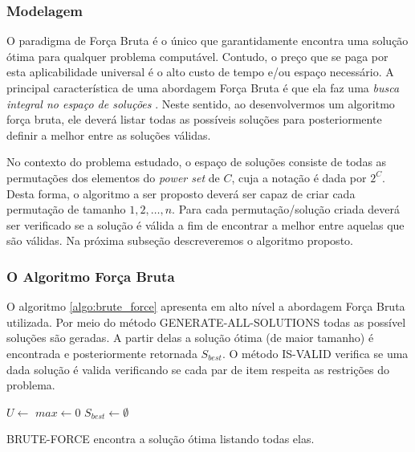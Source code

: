 \documentclass[12pt]{article}
\begin{document}
\subsubsection{Modelagem}
\label{subsubsec:model_fb}
O paradigma de Força Bruta é o único que garantidamente encontra uma solução ótima para qualquer problema computável. Contudo, o preço que se paga por esta aplicabilidade universal é o alto custo de tempo e/ou espaço necessário. A principal característica de uma abordagem Força Bruta é que ela faz uma \textit{busca integral no espaço de soluções} \cite{Kleinberg:2005:AD:1051910}{}. Neste sentido, ao desenvolvermos um algoritmo força bruta, ele deverá listar todas as possíveis soluções para posteriormente definir a melhor entre as soluções válidas.

No contexto do problema estudado, o espaço de soluções consiste de todas as permutações dos elementos do \textit{power set} de $C$, cuja a notação é dada por $2^{C}$. Desta forma, o algoritmo a ser proposto deverá ser capaz de criar cada permutação de tamanho $1,2,\ldots, n$. Para cada permutação/solução criada deverá ser verificado se a solução é válida a fim de encontrar a melhor entre aquelas que são válidas. Na próxima subseção descreveremos o algoritmo proposto.

\subsubsection{O Algoritmo Força Bruta}
\label{subsubsec:alg_fb}

O algoritmo \ref{algo:brute_force} apresenta em alto nível a abordagem Força Bruta utilizada. Por meio do método \textsc{GENERATE-ALL-SOLUTIONS} todas as possível soluções são geradas. A partir delas a solução ótima (de maior tamanho) é encontrada e posteriormente retornada $S_{best}$. O método \textsc{IS-VALID} verifica se uma dada solução é valida verificando se cada par de item respeita as restrições do problema.

\begin{algorithm}
\DontPrintSemicolon %

$U \gets $ \;
$max \gets 0$\;
$S_{best} \gets \emptyset$\;
 {
}
\;
\caption{{\sc BRUTE-FORCE} encontra a solução ótima listando todas elas.}
\label{algo:brute_force}
\end{algorithm}
\end{document}
